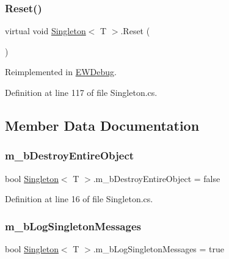 \subsubsection{\texorpdfstring{Reset()}{Reset()}}
{\footnotesize\ttfamily virtual void \mbox{\hyperlink{class_singleton}{Singleton}}$<$ T $>$.Reset (\begin{DoxyParamCaption}{ }\end{DoxyParamCaption})\hspace{0.3cm}{\ttfamily [virtual]}}



Reimplemented in \mbox{\hyperlink{class_e_w_debug_aac177b62905530131ea9a05026f95725}{E\+W\+Debug}}.



Definition at line 117 of file Singleton.\+cs.



\subsection{Member Data Documentation}
\mbox{\label{class_singleton_abd3bfd9c53c4075668cf836e56b7b9c1}} 
\subsubsection{\texorpdfstring{m\+\_\+b\+Destroy\+Entire\+Object}{m\_bDestroyEntireObject}}
{\footnotesize\ttfamily bool \mbox{\hyperlink{class_singleton}{Singleton}}$<$ T $>$.m\+\_\+b\+Destroy\+Entire\+Object = false}



Definition at line 16 of file Singleton.\+cs.

\mbox{\label{class_singleton_a7b7616e1b036d495f429f3e044bb3652}} 
\subsubsection{\texorpdfstring{m\+\_\+b\+Log\+Singleton\+Messages}{m\_bLogSingletonMessages}}
{\footnotesize\ttfamily bool \mbox{\hyperlink{class_singleton}{Singleton}}$<$ T $>$.m\+\_\+b\+Log\+Singleton\+Messages = true}



